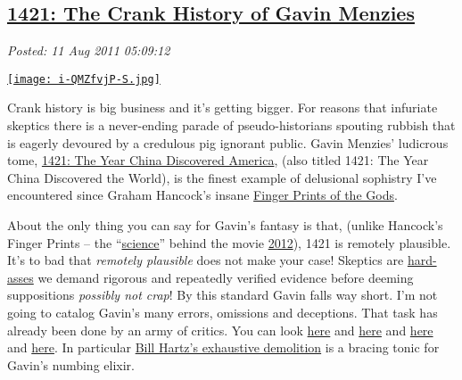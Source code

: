 %

\subsection*{\href{http://bakerjd99.wordpress.com/2011/08/11/1421-the-crank-history-of-gavin-menzies/}{1421: The Crank History of Gavin Menzies}}


\noindent\emph{Posted: 11 Aug 2011 05:09:12}
\vspace{6pt}

\captionsetup[floatingfigure]{labelformat=empty}
\begin{floatingfigure}[r]{0.25\textwidth}
\centering
\href{http://www.goodreads.com/book/show/4813.1421}{\texttt{[image: i-QMZfvjP-S.jpg]}}
\label{fig:1742X0}
\end{floatingfigure}Crank
history is big business and it's getting bigger. For reasons that
infuriate skeptics there is a never-ending parade of pseudo-historians
spouting rubbish that is eagerly devoured by a credulous pig ignorant
public. Gavin Menzies' ludicrous tome,
\href{http://www.1421exposed.com/html/1421\_and\_all\_that\_junk.html}{1421:
The Year China Discovered America}, (also titled 1421: The Year China
Discovered the World), is the finest example of delusional sophistry
I've encountered since Graham Hancock's insane
\href{http://www.csicop.org/si/show/tracing\_graham\_hancockrsquos\_shifting\_cataclysm/}{Finger
Prints of the Gods}.

About the only thing you can say for Gavin's fantasy is that, (unlike
Hancock's Finger Prints -- the
``\href{http://en.wikipedia.org/wiki/Fingerprints\_of\_the\_Gods}{science}''
behind the movie
\href{http://blog.moviefone.com/2011/01/03/nasa-names-most-realistic-and-unrealistic-sci-fi-films-of-all-ti/}{2012}),
1421 is remotely plausible. It's to bad that \emph{remotely plausible}
does not make your case! Skeptics are
\href{http://bakerjd99.wordpress.com/2009/10/29/hard-ass-skeptic-rules/}{hard-asses}
we demand rigorous and repeatedly verified evidence before deeming
suppositions \emph{possibly not crap}! By this standard Gavin falls way
short. I'm not going to catalog Gavin's many errors, omissions and
deceptions. That task has already been done by an army of critics. You
can look
\href{http://www.csicop.org/sb/show/zheng\_he\_in\_the\_americas\_and\_other\_unlikely\_tales\_of\_exploration\_and\_discov/}{here}
and
\href{https://docs.google.com/viewer?url=http://www.e-perimetron.org/Vol\_2\_4/Wade.pdf\&pli=1}{here}
and \href{http://www.asianreviewofbooks.com/new/?revID=201}{here} and
\href{http://badarchaeology.wordpress.com/tag/gavin-menzies/}{here}. In
particular \href{http://www.dightonrock.com/gavinsfantalyland.htm}{Bill
Hartz's exhaustive demolition} is a bracing tonic for Gavin's numbing
elixir.

